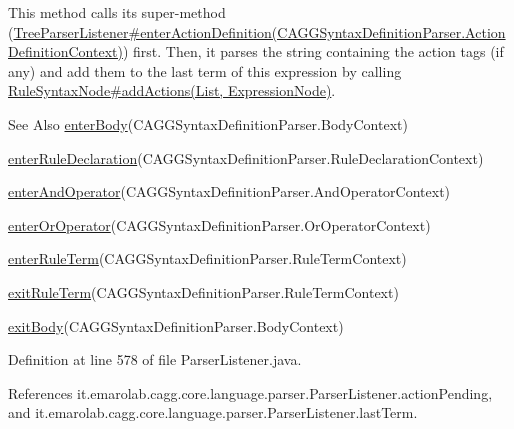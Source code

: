 This method calls its super-\/method (\hyperlink{}{Tree\-Parser\-Listener\#enter\-Action\-Definition(\-C\-A\-G\-G\-Syntax\-Definition\-Parser.\-Action\-Definition\-Context)}) first. Then, it parses the string containing the action tags (if any) and add them to the last term of this expression by calling \hyperlink{}{Rule\-Syntax\-Node\#add\-Actions(\-List, Expression\-Node)}. \begin{DoxySeeAlso}{See Also}
\hyperlink{classit_1_1emarolab_1_1cagg_1_1core_1_1language_1_1parser_1_1ParserListener_a9675dd98156b94a9e26cea3946eaa69d}{enter\-Body}(C\-A\-G\-G\-Syntax\-Definition\-Parser.\-Body\-Context) 

\hyperlink{classit_1_1emarolab_1_1cagg_1_1core_1_1language_1_1parser_1_1ParserListener_a23734ed11648eae22a037a43e8c2d007}{enter\-Rule\-Declaration}(C\-A\-G\-G\-Syntax\-Definition\-Parser.\-Rule\-Declaration\-Context) 

\hyperlink{classit_1_1emarolab_1_1cagg_1_1core_1_1language_1_1parser_1_1ParserListener_a27394515e7347376dc937974202abbc9}{enter\-And\-Operator}(C\-A\-G\-G\-Syntax\-Definition\-Parser.\-And\-Operator\-Context) 

\hyperlink{classit_1_1emarolab_1_1cagg_1_1core_1_1language_1_1parser_1_1ParserListener_a0c20b78d0166b7fe8cf816764d9c7c86}{enter\-Or\-Operator}(C\-A\-G\-G\-Syntax\-Definition\-Parser.\-Or\-Operator\-Context) 

\hyperlink{classit_1_1emarolab_1_1cagg_1_1core_1_1language_1_1parser_1_1ParserListener_ab55244dd0bc74c42338389ef4f186963}{enter\-Rule\-Term}(C\-A\-G\-G\-Syntax\-Definition\-Parser.\-Rule\-Term\-Context) 

\hyperlink{classit_1_1emarolab_1_1cagg_1_1core_1_1language_1_1parser_1_1ParserListener_a9cddde49b7fd2142b1fcd72b5d6e2c51}{exit\-Rule\-Term}(C\-A\-G\-G\-Syntax\-Definition\-Parser.\-Rule\-Term\-Context) 

\hyperlink{classit_1_1emarolab_1_1cagg_1_1core_1_1language_1_1parser_1_1ParserListener_a4ddc07fbccb866fee058db32839fba42}{exit\-Body}(C\-A\-G\-G\-Syntax\-Definition\-Parser.\-Body\-Context) 
\end{DoxySeeAlso}


Definition at line 578 of file Parser\-Listener.\-java.



References it.\-emarolab.\-cagg.\-core.\-language.\-parser.\-Parser\-Listener.\-action\-Pending, and it.\-emarolab.\-cagg.\-core.\-language.\-parser.\-Parser\-Listener.\-last\-Term.


